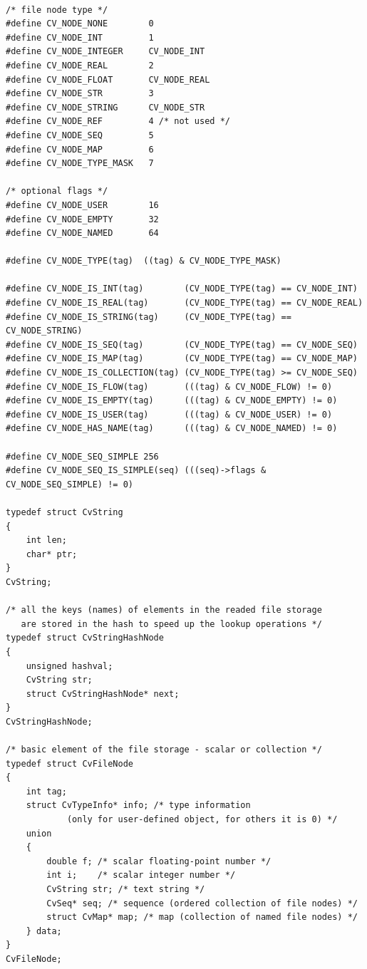 \begin{lstlisting}

/* file node type */
#define CV_NODE_NONE        0
#define CV_NODE_INT         1
#define CV_NODE_INTEGER     CV_NODE_INT
#define CV_NODE_REAL        2
#define CV_NODE_FLOAT       CV_NODE_REAL
#define CV_NODE_STR         3
#define CV_NODE_STRING      CV_NODE_STR
#define CV_NODE_REF         4 /* not used */
#define CV_NODE_SEQ         5
#define CV_NODE_MAP         6
#define CV_NODE_TYPE_MASK   7

/* optional flags */
#define CV_NODE_USER        16
#define CV_NODE_EMPTY       32
#define CV_NODE_NAMED       64

#define CV_NODE_TYPE(tag)  ((tag) & CV_NODE_TYPE_MASK)

#define CV_NODE_IS_INT(tag)        (CV_NODE_TYPE(tag) == CV_NODE_INT)
#define CV_NODE_IS_REAL(tag)       (CV_NODE_TYPE(tag) == CV_NODE_REAL)
#define CV_NODE_IS_STRING(tag)     (CV_NODE_TYPE(tag) == CV_NODE_STRING)
#define CV_NODE_IS_SEQ(tag)        (CV_NODE_TYPE(tag) == CV_NODE_SEQ)
#define CV_NODE_IS_MAP(tag)        (CV_NODE_TYPE(tag) == CV_NODE_MAP)
#define CV_NODE_IS_COLLECTION(tag) (CV_NODE_TYPE(tag) >= CV_NODE_SEQ)
#define CV_NODE_IS_FLOW(tag)       (((tag) & CV_NODE_FLOW) != 0)
#define CV_NODE_IS_EMPTY(tag)      (((tag) & CV_NODE_EMPTY) != 0)
#define CV_NODE_IS_USER(tag)       (((tag) & CV_NODE_USER) != 0)
#define CV_NODE_HAS_NAME(tag)      (((tag) & CV_NODE_NAMED) != 0)

#define CV_NODE_SEQ_SIMPLE 256
#define CV_NODE_SEQ_IS_SIMPLE(seq) (((seq)->flags & CV_NODE_SEQ_SIMPLE) != 0)

typedef struct CvString
{
    int len;
    char* ptr;
}
CvString;

/* all the keys (names) of elements in the readed file storage
   are stored in the hash to speed up the lookup operations */
typedef struct CvStringHashNode
{
    unsigned hashval;
    CvString str;
    struct CvStringHashNode* next;
}
CvStringHashNode;

/* basic element of the file storage - scalar or collection */
typedef struct CvFileNode
{
    int tag;
    struct CvTypeInfo* info; /* type information
            (only for user-defined object, for others it is 0) */
    union
    {
        double f; /* scalar floating-point number */
        int i;    /* scalar integer number */
        CvString str; /* text string */
        CvSeq* seq; /* sequence (ordered collection of file nodes) */
        struct CvMap* map; /* map (collection of named file nodes) */
    } data;
}
CvFileNode;

\end{lstlisting}

